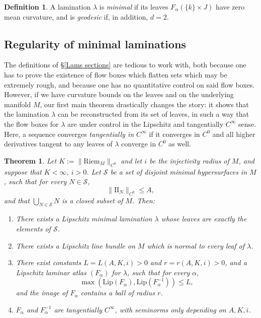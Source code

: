 \documentclass[reqno,11pt]{amsart}
\newcommand{\Two}{\mathrm{I\!I}}
\newcommand{\Lip}{\mathrm{Lip}}
\newcommand{\Riem}{\mathrm{Riem}}
\newcommand{\dfn}[1]{\emph{#1}\index{#1}}
\newtheorem{mainthm}{Theorem}
\theoremstyle{definition}
\newtheorem{definition}[theorem]{Definition}
\numberwithin{equation}{section}
\begin{document}
\begin{definition}
A lamination $\lambda$ is \dfn{minimal} if its leaves $F_\alpha(\{k\} \times J)$ have zero mean curvature, and is \dfn{geodesic} if, in addition, $d = 2$.
\end{definition}

\subsection{Regularity of minimal laminations}
The definitions of \S\ref{Lams sections} are tedious to work with, both because one has to prove the existence of flow boxes which flatten sets which may be extremely rough, and because one has no quantitative control on said flow boxes.
However, if we have curvature bounds on the leaves and on the underlying manifold $M$, our first main theorem drastically changes the story: it shows that the lamination $\lambda$ can be reconstructed from its set of leaves, in such a way that the flow boxes for $\lambda$ are under control in the Lipschitz and tangentially $C^\infty$ sense.
Here, a sequence converges \dfn{tangentially in $C^\infty$} if it converges in $C^0$ and all higher derivatives tangent to any leaves of $\lambda$ converge in $C^0$ as well.

\begin{mainthm}\label{regularity theorem}
Let $K := \|\Riem_M\|_{C^0}$ and let $i$ be the injectivity radius of $M$, and suppose that $K < \infty$, $i > 0$.
Let $\mathcal S$ be a set of disjoint minimal hypersurfaces in $M$, such that for every $N \in \mathcal S$,
\begin{equation}\label{curvature bound in regularity}
	\|\Two_N\|_{C^0} \leq A,
\end{equation}
and that $\bigcup_{N \in \mathcal S} N$ is a closed subset of $M$. Then:
\begin{enumerate}
\item There exists a Lipschitz minimal lamination $\lambda$ whose leaves are exactly the elements of $\mathcal S$.
\item There exists a Lipschitz line bundle on $M$ which is normal to every leaf of $\lambda$.
\item There exist constants $L = L(A, K, i) > 0$ and $r = r(A, K, i) > 0$, and a Lipschitz laminar atlas $(F_\alpha)$ for $\lambda$, such that for every $\alpha$,
\begin{equation}\label{conorm of flow box}
	\max(\Lip(F_\alpha), \Lip(F_\alpha^{-1})) \leq L,
\end{equation}
and the image of $F_\alpha$ contains a ball of radius $r$.
\item $F_\alpha$ and $F_\alpha^{-1}$ are tangentially $C^\infty$, with seminorms only depending on $A, K, i$.
\end{enumerate}
\end{mainthm}
\end{document}
